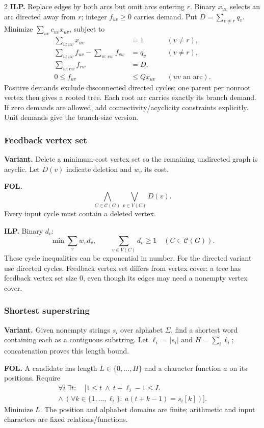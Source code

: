 \documentclass[8pt]{extarticle}
\theoremstyle{definition}
\begin{document}
\begin{multicols*}{2}
\textbf{ILP.} Replace edges by both arcs but omit arcs entering $r$.
Binary $x_{uv}$ selects an arc directed away from $r$; integer $f_{uv}\ge0$
carries demand. Put $D=\sum_{v\ne r}q_v$. Minimize
$\sum_{uv}c_{uv}x_{uv}$, subject to
\[
\begin{aligned}
 \sum_{u:uv}x_{uv}&=1 &&(v\ne r),\\
 \sum_{u:uv}f_{uv}-\sum_{w:vw}f_{vw}&=q_v &&(v\ne r),\\
 \sum_{w:rw}f_{rw}&=D,\\
 0\le f_{uv}&\le Qx_{uv} &&(uv\text{ an arc}).
\end{aligned}
\]
Positive demands exclude disconnected directed cycles; one parent per
nonroot vertex then gives a rooted tree. Each root arc carries exactly its
branch demand. If zero demands are allowed, add connectivity/acyclicity
constraints explicitly. Unit demands give the branch-size version.

\subsubsection{Feedback vertex set}\label{form:fvs}
\textbf{Variant.} Delete a minimum-cost vertex set so the remaining
undirected graph is acyclic. Let $D(v)$ indicate deletion and $w_v$ its cost.

\textbf{FOL.}
\[
 \bigwedge_{C\in\mathcal C(G)}\bigvee_{v\in V(C)}D(v).
\]
Every input cycle must contain a deleted vertex.

\textbf{ILP.} Binary $d_v$:
\[
 \min\sum_vw_vd_v,\qquad
 \sum_{v\in V(C)}d_v\ge1\quad(C\in\mathcal C(G)).
\]
These cycle inequalities can be exponential in number. For the directed
variant use directed cycles. Feedback vertex set differs from vertex cover:
a tree has feedback vertex set size 0, even though its edges may need a
nonempty vertex cover.

\subsubsection{Shortest superstring}\label{form:string}
\textbf{Variant.} Given nonempty strings $s_i$ over alphabet $\Sigma$, find
a shortest word containing each as a contiguous substring. Let
$\ell_i=|s_i|$ and $H=\sum_i\ell_i$; concatenation proves this length bound.

\textbf{FOL.} A candidate has length $L\in\{0,\ldots,H\}$ and a character
function $a$ on its positions. Require
\[
\begin{gathered}
 \forall i\;\exists t:\quad
 \bigl[1\le t\ \land\ t+\ell_i-1\le L\\
 \land\ (\forall k\in\{1,\ldots,\ell_i\}:\ a(t+k-1)=s_i[k])\bigr].
\end{gathered}
\]
Minimize $L$. The position and alphabet domains are finite; arithmetic and
input characters are fixed relations/functions.


\end{multicols*}
\end{document}
